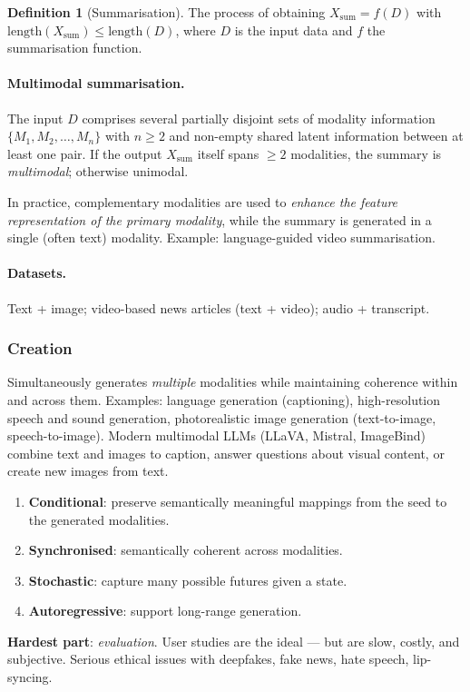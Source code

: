 \documentclass[11pt,a4paper]{article}
\theoremstyle{definition}
\newtheorem{definition}{Definition}[section]
\theoremstyle{plain}
\theoremstyle{remark}
\begin{document}
\begin{definition}[Summarisation]
The process of obtaining $X_{\text{sum}} = f(D)$ with $\mathrm{length}(X_{\text{sum}}) \leq \mathrm{length}(D)$, where $D$ is the input data and $f$ the summarisation function.
\end{definition}

\paragraph{Multimodal summarisation.} The input $D$ comprises several partially disjoint sets of modality information $\{M_1, M_2, \ldots, M_n\}$ with $n \geq 2$ and non-empty shared latent information between at least one pair. If the output $X_{\text{sum}}$ itself spans $\geq 2$ modalities, the summary is \emph{multimodal}; otherwise unimodal.

In practice, complementary modalities are used to \emph{enhance the feature representation of the primary modality}, while the summary is generated in a single (often text) modality. Example: language-guided video summarisation.

\paragraph{Datasets.} Text + image; video-based news articles (text + video); audio + transcript.

\subsubsection{Creation}

Simultaneously generates \emph{multiple} modalities while maintaining coherence within and across them. Examples: language generation (captioning), high-resolution speech and sound generation, photorealistic image generation (text-to-image, speech-to-image). Modern multimodal LLMs (LLaVA, Mistral, ImageBind) combine text and images to caption, answer questions about visual content, or create new images from text.

\begin{tcolorbox}[colback=red!5!white, colframe=red!60!black, title={Creation: four hard requirements}]
\begin{enumerate}
    \item \textbf{Conditional}: preserve semantically meaningful mappings from the seed to the generated modalities.
    \item \textbf{Synchronised}: semantically coherent across modalities.
    \item \textbf{Stochastic}: capture many possible futures given a state.
    \item \textbf{Autoregressive}: support long-range generation.
\end{enumerate}
\textbf{Hardest part}: \emph{evaluation}. User studies are the ideal --- but are slow, costly, and subjective. Serious ethical issues with deepfakes, fake news, hate speech, lip-syncing.
\end{tcolorbox}
\end{document}
